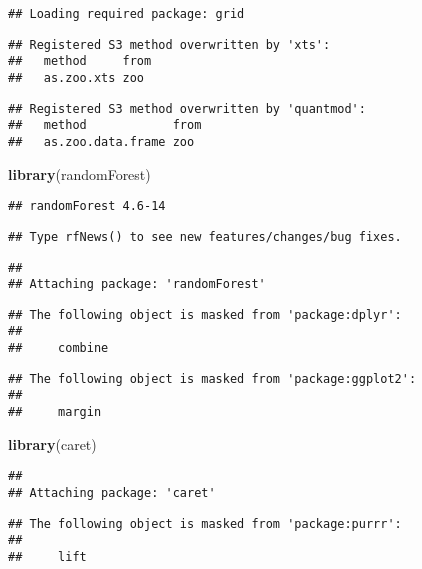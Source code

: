 \documentclass[]{article}
\newenvironment{Shaded}{\begin{snugshade}}{\end{snugshade}}
\newcommand{\KeywordTok}[1]{\textcolor[rgb]{0.13,0.29,0.53}{\textbf{#1}}}
\newcommand{\NormalTok}[1]{#1}
\begin{document}
\begin{verbatim}
## Loading required package: grid
\end{verbatim}

\begin{verbatim}
## Registered S3 method overwritten by 'xts':
##   method     from
##   as.zoo.xts zoo
\end{verbatim}

\begin{verbatim}
## Registered S3 method overwritten by 'quantmod':
##   method            from
##   as.zoo.data.frame zoo
\end{verbatim}

\begin{Shaded}
\begin{Highlighting}[]
\KeywordTok{library}\NormalTok{(randomForest)  }
\end{Highlighting}
\end{Shaded}

\begin{verbatim}
## randomForest 4.6-14
\end{verbatim}

\begin{verbatim}
## Type rfNews() to see new features/changes/bug fixes.
\end{verbatim}

\begin{verbatim}
## 
## Attaching package: 'randomForest'
\end{verbatim}

\begin{verbatim}
## The following object is masked from 'package:dplyr':
## 
##     combine
\end{verbatim}

\begin{verbatim}
## The following object is masked from 'package:ggplot2':
## 
##     margin
\end{verbatim}

\begin{Shaded}
\begin{Highlighting}[]
\KeywordTok{library}\NormalTok{(caret)}
\end{Highlighting}
\end{Shaded}

\begin{verbatim}
## 
## Attaching package: 'caret'
\end{verbatim}

\begin{verbatim}
## The following object is masked from 'package:purrr':
## 
##     lift
\end{verbatim}
\end{document}
